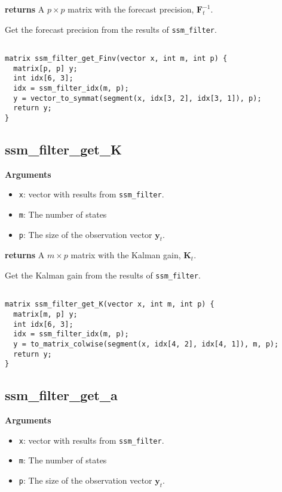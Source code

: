 \documentclass[]{book}
\providecommand{\tightlist}{%
  \setlength{\itemsep}{0pt}\setlength{\parskip}{0pt}}
\newcommand{\mat}[1]{\boldsymbol{#1}}
\renewcommand{\vec}[1]{\boldsymbol{#1}}
\begin{document}
\textbf{returns} A \(p \times p\) matrix with the forecast precision,
\(\mat{F}^{-1}_t\).

Get the forecast precision from the results of \texttt{ssm\_filter}.

\begin{verbatim}

matrix ssm_filter_get_Finv(vector x, int m, int p) {
  matrix[p, p] y;
  int idx[6, 3];
  idx = ssm_filter_idx(m, p);
  y = vector_to_symmat(segment(x, idx[3, 2], idx[3, 1]), p);
  return y;
}

\end{verbatim}

\subsection{ssm\_filter\_get\_K}\label{ssm_filter_get_k}

\textbf{Arguments}

\begin{itemize}
\tightlist
\item
  \texttt{x}: vector with results from \texttt{ssm\_filter}.
\item
  \texttt{m}: The number of states
\item
  \texttt{p}: The size of the observation vector \(\vec{y}_t\).
\end{itemize}

\textbf{returns} A \(m \times p\) matrix with the Kalman gain,
\(\mat{K}_t\).

Get the Kalman gain from the results of \texttt{ssm\_filter}.

\begin{verbatim}

matrix ssm_filter_get_K(vector x, int m, int p) {
  matrix[m, p] y;
  int idx[6, 3];
  idx = ssm_filter_idx(m, p);
  y = to_matrix_colwise(segment(x, idx[4, 2], idx[4, 1]), m, p);
  return y;
}

\end{verbatim}

\subsection{ssm\_filter\_get\_a}\label{ssm_filter_get_a}

\textbf{Arguments}

\begin{itemize}
\tightlist
\item
  \texttt{x}: vector with results from \texttt{ssm\_filter}.
\item
  \texttt{m}: The number of states
\item
  \texttt{p}: The size of the observation vector \(\vec{y}_t\).
\end{itemize}
\end{document}
